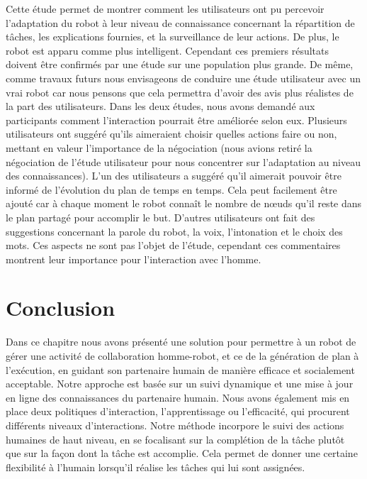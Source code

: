 \documentclass[a4paper,11pt,twoside]{StyleThese}
\begin{document}
Cette étude permet de montrer comment les utilisateurs ont pu percevoir l'adaptation du robot à leur niveau de connaissance concernant la répartition de tâches, les explications fournies, et la surveillance de leur actions. De plus, le robot est apparu comme plus intelligent. Cependant ces premiers résultats doivent être confirmés par une étude sur une population plus grande. De même, comme travaux futurs nous envisageons de conduire une étude utilisateur avec un vrai robot car nous pensons que cela permettra d'avoir des avis plus réalistes de la part des utilisateurs.
Dans les deux études, nous avons demandé aux participants comment l'interaction pourrait être améliorée selon eux.
Plusieurs utilisateurs ont suggéré qu'ils aimeraient choisir quelles actions faire ou non, mettant en valeur l'importance de la négociation (nous avions retiré la négociation de l'étude utilisateur pour nous concentrer sur l'adaptation au niveau des connaissances). L'un des utilisateurs a suggéré qu'il aimerait pouvoir être informé de l'évolution du plan de temps en temps. 
Cela peut facilement être ajouté car à chaque moment le robot connaît le nombre de nœuds qu'il reste dans le plan partagé pour accomplir le but.
D'autres utilisateurs ont fait des suggestions concernant la parole du robot, la voix, l'intonation et le choix des mots. Ces aspects ne sont pas l'objet de l'étude, cependant ces commentaires montrent leur importance pour l'interaction avec l'homme.

%






\section{Conclusion}
Dans ce chapitre nous avons présenté une solution pour permettre à un robot de gérer une activité de collaboration homme-robot, et ce de la génération de plan à l'exécution, en guidant son partenaire humain de manière efficace et socialement acceptable.
Notre approche est basée sur un suivi dynamique et une mise à jour en ligne des connaissances du partenaire humain. 
Nous avons également mis en place deux politiques d'interaction, l'apprentissage ou l'efficacité, qui procurent différents niveaux d'interactions. 
Notre méthode incorpore le suivi des actions humaines de haut niveau, en se focalisant sur la complétion de la tâche plutôt que sur la façon dont la tâche est accomplie. Cela permet de donner une certaine flexibilité à l'humain lorsqu'il réalise les tâches qui lui sont assignées.
\end{document}
